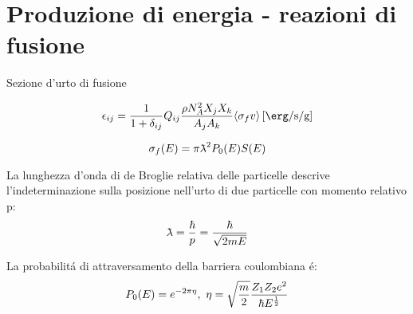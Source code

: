 
\section{Produzione di energia - reazioni di fusione}

\begin{frame}{Sezione d'urto di fusione}

\begin{equation}
\epsilon_{ij}=\frac{1}{1+\delta_{ij}}Q_{ij}\frac{\rho N_A^2X_jX_k}{{A_jA_k}}\exv{\sigma_f v}\, [\si{\erg\per\second\per\gram}]\label{eq:energyrate}
\end{equation}

\begin{equation}
\sigma_f(E)=\pi\lambdabar^2P_0(E)S(E)
\end{equation}

La lunghezza d'onda di de Broglie relativa delle particelle descrive l'indeterminazione sulla posizione nell'urto di due particelle con momento relativo p:
\begin{equation}
\lambdabar=\frac{\hbar}{p}=\frac{\hbar}{\sqrt{2mE}}
\end{equation}

La probabilit\'a di attraversamento della barriera coulombiana \'e:
\begin{equation}
P_0(E)=\exp{-2\pi\eta},\ \eta=\sqrt{\frac{m}{2}}\frac{Z_1Z_2e^2}{\hbar E\expy{\frac{1}{2}}}
\end{equation}

\end{frame}



